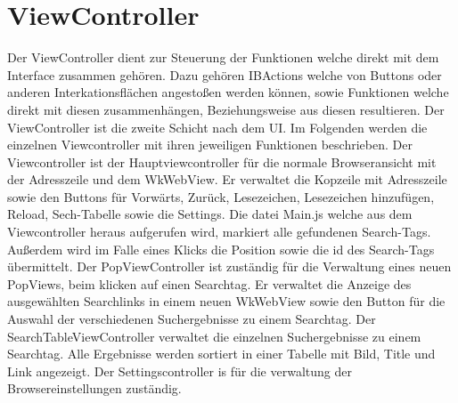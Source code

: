 
\section{ViewController}
Der ViewController dient zur Steuerung der Funktionen welche direkt mit dem Interface zusammen gehören. Dazu gehören
IBActions welche von Buttons oder anderen Interkationsflächen angestoßen werden können, sowie Funktionen welche direkt mit diesen zusammenhängen, Beziehungsweise aus diesen resultieren. Der ViewController ist die zweite Schicht nach dem UI. Im
Folgenden werden die einzelnen Viewcontroller mit ihren jeweiligen Funktionen beschrieben.
Der Viewcontroller ist der Hauptviewcontroller für die normale Browseransicht mit der Adresszeile und dem WkWebView. Er verwaltet die Kopzeile mit Adresszeile sowie den Buttons für Vorwärts, Zurück, Lesezeichen, Lesezeichen hinzufügen, Reload, Sech-Tabelle sowie die Settings. Die datei Main.js welche aus dem Viewcontroller heraus aufgerufen wird, markiert alle gefundenen Search-Tags. Außerdem wird im Falle eines Klicks die Position sowie die id des Search-Tags übermittelt.
Der PopViewController ist zuständig für die Verwaltung eines neuen PopViews, beim klicken auf einen Searchtag. Er verwaltet die Anzeige des ausgewählten Searchlinks in einem neuen WkWebView sowie den Button für die Auswahl der verschiedenen Suchergebnisse zu einem Searchtag.
Der SearchTableViewController verwaltet die einzelnen Suchergebnisse zu einem Searchtag. Alle Ergebnisse werden sortiert in einer Tabelle mit Bild, Title und Link angezeigt.
Der Settingscontroller is für die verwaltung der Browsereinstellungen zuständig.


